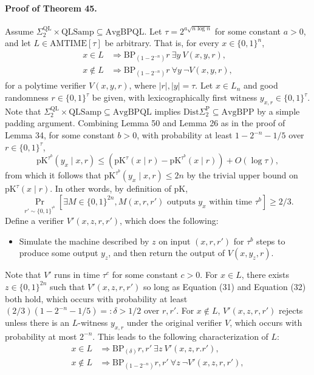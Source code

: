 \paragraph{Proof of Theorem 45.} Assume $\Sigma_2^{\mathrm{QL}}\times\mathrm{QLSamp}\subseteq\mathrm{AvgBPQL}$. Let $\tau=2^{a\sqrt{n\log n}}$ for some constant $a>0$, and let $L\in\mathrm{AMTIME}[\tau]$ be arbitrary. That is, for every $x\in\{0,1\}^n$,
\begin{align*}
x\in L&\Longrightarrow\mathrm{BP}_{(1-2^{-n})}r\ \exists y\ V(x,y,r),\\
x\notin L&\Longrightarrow\mathrm{BP}_{(1-2^{-n})}r\ \forall y\ \neg V(x,y,r),
\end{align*}
for a polytime verifier $V(x,y,r)$, where $|r|,|y|=\tau$. Let $x\in L_n$ and good randomness $r\in\{0,1\}^\tau$ be given, with lexicographically first witness $y_{x,r}\in\{0,1\}^\tau$.
Note that $\Sigma_2^{\mathrm{QL}}\times\mathrm{QLSamp}\subseteq\mathrm{AvgBPQL}$ implies $\mathrm{Dist}\Sigma_2^{\mathrm P}\subseteq\mathrm{AvgBPP}$ by a simple padding argument. Combining Lemma 50 and Lemma 26 as in the proof of Lemma 34, for some constant $b>0$, with probability at least $1-2^{-n}-1/5$ over $r\in\{0,1\}^\tau$,
\[\mathrm{pK}^{\tau^b}(y_x\mid x,r)\leq(\mathrm{pK}^\tau(x\mid r)-\mathrm{pK}^{\tau^b}(x\mid r))+O(\log\tau),\tag{31}\]
from which it follows that $\mathrm{pK}^{\tau^b}(y_x\mid x,r)\leq2n$ by the trivial upper bound on $\mathrm{pK}^\tau(x\mid r)$. In other words, by definition of pK,
\[\Pr_{r'\sim\{0,1\}^{\tau^b}}[\exists M\in\{0,1\}^{2n},M(x,r,r')\text{ outputs }y_x\text{ within time }\tau^b]\geq2/3.\tag{32}\]
Define a verifier $V'(x,z,r,r')$, which does the following:
\begin{itemize}
\item Simulate the machine described by $z$ on input $(x,r,r')$ for $\tau^b$ steps to produce some output $y_z$, and then return the output of $V(x,y_z,r)$.
\end{itemize}
Note that $V'$ runs in time $\tau^c$ for some constant $c>0$. For $x\in L$, there exists $z\in\{0,1\}^{2n}$ such that $V'(x,z,r,r')$ so long as Equation (31) and Equation (32) both hold, which occurs with probability at least $(2/3)(1-2^{-n}-1/5)=:\delta>1/2$ over $r,r'$. For $x\notin L$, $V'(x,z,r,r')$ rejects unless there is an $L$-witness $y_{x,r}$ under the original verifier $V$, which occurs with probability at most $2^{-n}$. This leads to the following characterization of $L$:
\begin{align*}
x\in L&\Longrightarrow\mathrm{BP}_{(\delta)}r,r'\ \exists z\ V'(x,z,r.r'),\\
x\notin L&\Longrightarrow\mathrm{BP}_{(1-2^{-n})}r,r'\ \forall z\ \neg V'(x,z,r,r'),
\end{align*}
